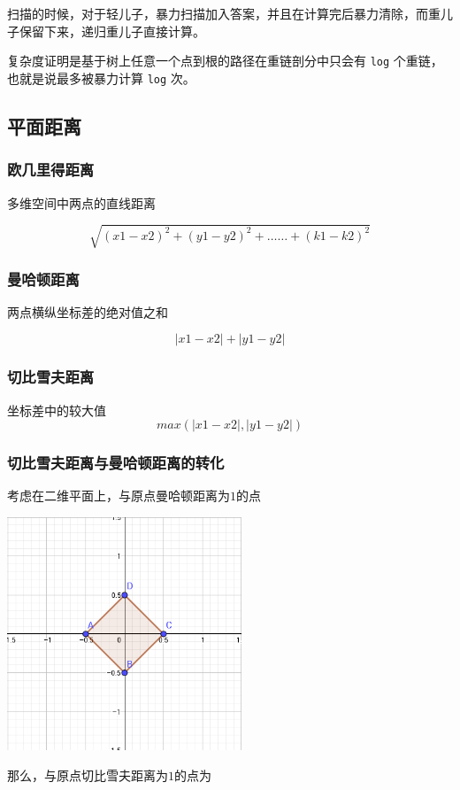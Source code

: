 \documentclass[UTF-8]{ctexart}
\begin{document}
扫描的时候，对于轻儿子，暴力扫描加入答案，并且在计算完后暴力清除，而重儿子保留下来，递归重儿子直接计算。

复杂度证明是基于树上任意一个点到根的路径在重链剖分中只会有 \texttt{log} 个重链，也就是说最多被暴力计算 \texttt{log} 次。

\subsection{平面距离}
\subsubsection{欧几里得距离}
多维空间中两点的直线距离  

$$\sqrt{(x1-x2)^2+(y1-y2)^2+……+(k1-k2)^2}$$

\subsubsection{曼哈顿距离}
两点横纵坐标差的绝对值之和

$$|x1-x2|+|y1-y2|$$

\subsubsection{切比雪夫距离}
坐标差中的较大值
$$max(|x1-x2|,|y1-y2|)$$

\subsubsection{切比雪夫距离与曼哈顿距离的转化}
考虑在二维平面上，与原点曼哈顿距离为$1$的点

\begin{center}
	\includegraphics[width=7cm]{file//manhattan.png}
\end{center}

那么，与原点切比雪夫距离为$1$的点为 
\end{document}
